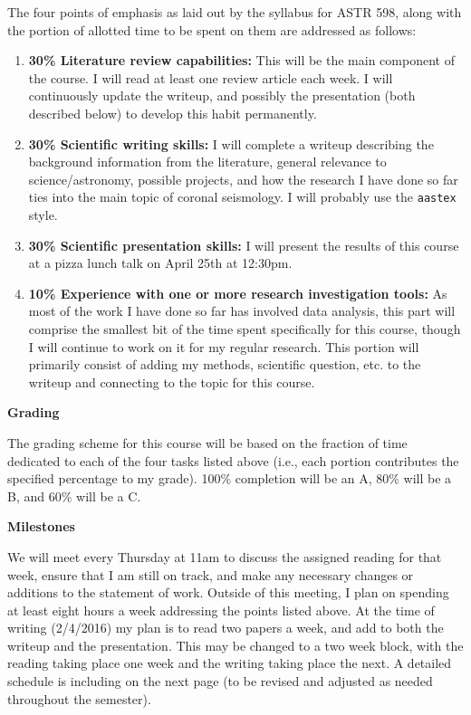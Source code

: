 \documentclass[12pt]{article}
\begin{document}
The four points of emphasis as laid out by the syllabus for ASTR
598, along with the portion of allotted time to be spent on them
are addressed as follows:
\begin{enumerate}
    \item \textbf{30\% Literature review capabilities:} This will be the main
        component of the course. I will read at least one review article
        each week. I will continuously update the writeup, and
        possibly the presentation (both described below)
        to develop this habit permanently.
    \item \textbf{30\% Scientific writing skills:} I will complete a
        writeup describing the
        background information from the literature, general
        relevance to science/astronomy, possible projects, and how the
        research I have done so far ties into the main topic of coronal
        seismology. I will probably use the \texttt{aastex} style.
    \item \textbf{30\% Scientific presentation skills:}
        I will present the results
        of this course at a pizza lunch talk on April 25th at 12:30pm.
    \item \textbf{10\% Experience with one or more research investigation
    tools:}
        As most of the work I have done so far has involved data
        analysis, this
        part will comprise the smallest bit of the time spent
        specifically for
        this course, though I will continue to work on it for my regular
        research. This portion will primarily consist of adding my
        methods, scientific question, etc. to the writeup and
        connecting to the topic for this course.
\end{enumerate}

\large\textbf{Grading}\normalsize

The grading scheme for this course will be based on the fraction of
time dedicated to each of the four tasks listed above (i.e., each
portion contributes the specified percentage to my grade).
100\% completion will be an A, 80\% will be a B, and 60\% will be a C.


\large\textbf{Milestones}\normalsize

We will meet every Thursday at 11am to discuss the assigned reading
for that week, ensure that I am still on track, and make any necessary
changes or additions to the statement of work.
Outside of this meeting, I plan on spending at least eight
hours a week addressing the points listed above.
At the time of writing (2/4/2016) my plan is to read two papers a
week, and add to both the writeup and the presentation. This may be
changed to a two week block, with the reading taking place one week
and the writing taking place the next.
A detailed schedule is including on the next page (to be revised and
adjusted as
needed throughout the semester).
\end{document}
